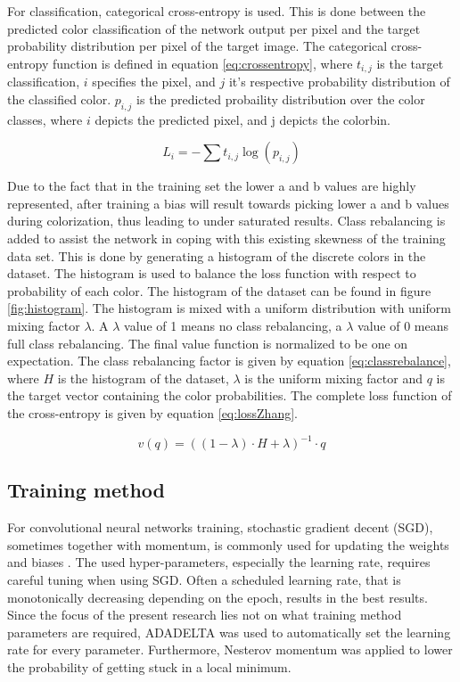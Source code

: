 For classification, categorical cross-entropy is used. This is done between the predicted color classification of the network output per pixel and the target probability distribution per pixel of the target image. The categorical cross-entropy function is defined in equation \ref{eq:crossentropy}, where $t_{i,j}$ is the target classification, $i$ specifies the pixel, and $j$ it's respective probability distribution of the classified color. 
$p_{i,j}$ is the predicted probaility distribution over the color classes, where $i$ depicts the predicted pixel, and j depicts the colorbin.

\begin{equation}
\label{eq:crossentropy}
L_{i} = -\sum t_{i,j}\log(p_{i,j})
\end{equation}

Due to the fact that in the training set the lower a and b values are highly represented, after training a bias will result towards picking lower a and b values during colorization, thus leading to under saturated results. 
Class rebalancing is added to assist the network in coping with this existing skewness of the training data set. This is done by generating a histogram of the discrete colors in the dataset. The histogram is used to balance the loss function with respect to probability of each color. The histogram of the dataset can be found in figure \ref{fig:histogram}. The  histogram is mixed with a uniform distribution with uniform mixing factor $\lambda$. A $\lambda$ value of 1 means no class rebalancing, a $\lambda$ value of 0 means full class rebalancing. The final value function is normalized to be one on expectation. The class rebalancing factor is given by equation \ref{eq:classrebalance}, where $H$ is the histogram of the dataset, $\lambda$ is the uniform mixing factor and $q$ is the target vector containing the color probabilities. The complete loss function of the cross-entropy is given by equation \ref{eq:lossZhang}.

\begin{equation}\label{eq:classrebalance}
v(q) = ((1 - \lambda)\cdot H + \lambda)^{-1} \cdot q
\end{equation}
 
\subsection{Training method}
For convolutional neural networks training, stochastic gradient decent (SGD), sometimes together with momentum, is commonly used for updating the weights and biases \cite{IizukaSIGGRAPH2016}\cite{Simonyan}. The used hyper-parameters, especially the learning rate, requires careful tuning when using SGD. Often a scheduled learning rate, that is monotonically decreasing depending on the epoch, results in the best results. Since the focus of the present research lies not on what training method parameters are required, ADADELTA was used to automatically set the learning rate for every parameter\cite{zeiler2012adadelta}. Furthermore, Nesterov momentum was applied to lower the probability of getting stuck in a local minimum\cite{sutskever2013importance}.


